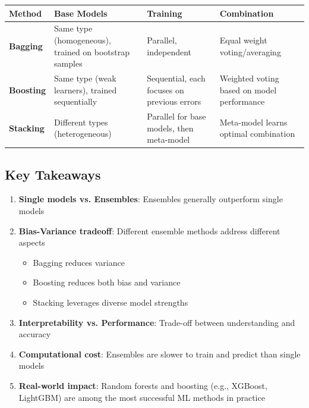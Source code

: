 \documentclass[11pt,a4paper]{article}
\theoremstyle{definition}
\theoremstyle{plain}
\theoremstyle{remark}
\begin{document}
\begin{center}
\small
\begin{tabular}{|p{2.5cm}|p{3.5cm}|p{3.5cm}|p{3.5cm}|}
\hline
\textbf{Method} & \textbf{Base Models} & \textbf{Training} & \textbf{Combination} \\
\hline
\textbf{Bagging} & Same type (homogeneous), trained on bootstrap samples & Parallel, independent & Equal weight voting/averaging \\
\hline
\textbf{Boosting} & Same type (weak learners), trained sequentially & Sequential, each focuses on previous errors & Weighted voting based on model performance \\
\hline
\textbf{Stacking} & Different types (heterogeneous) & Parallel for base models, then meta-model & Meta-model learns optimal combination \\
\hline
\end{tabular}
\end{center}

\subsection{Key Takeaways}

\begin{tcolorbox}[colback=green!5!white,colframe=green!75!black,title=\textbf{Main Lessons}]
\begin{enumerate}
    \item \textbf{Single models vs. Ensembles}: Ensembles generally outperform single models
    
    \item \textbf{Bias-Variance tradeoff}: Different ensemble methods address different aspects
    \begin{itemize}
        \item Bagging reduces variance
        \item Boosting reduces both bias and variance
        \item Stacking leverages diverse model strengths
    \end{itemize}
    
    \item \textbf{Interpretability vs. Performance}: Trade-off between understanding and accuracy
    
    \item \textbf{Computational cost}: Ensembles are slower to train and predict than single models
    
    \item \textbf{Real-world impact}: Random forests and boosting (e.g., XGBoost, LightGBM) are among the most successful ML methods in practice
\end{enumerate}
\end{tcolorbox}
\end{document}
